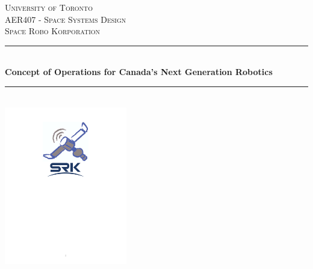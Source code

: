 \newcommand{\HRule}{\rule{\linewidth}{0.5mm}} %
\begin{titlepage}


\center %
 

\textsc{\LARGE University of Toronto}\\[1.2cm] %
\textsc{\Large AER407 - Space Systems Design}\\[0.5cm] %
\textsc{\large Space Robo Korporation}\\[0.5cm] %


\HRule \\[0.4cm]
{ \huge \bfseries Concept of Operations for Canada's Next Generation Robotics}\\[0.5cm] %
\HRule \\[1.2cm]


\includegraphics[width=0.4\textwidth]{logo}\\[1cm] 




\end{titlepage}
